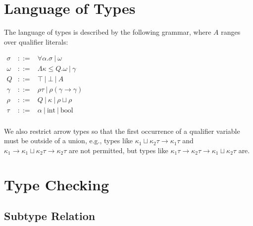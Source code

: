 \documentclass{article}
\begin{document}
\section{Language of Types}

The language of types is described by the following grammar, where $A$ ranges over qualifier literals:

\begin{math}
\begin{array}{rcl}
\sigma & ::= & \forall \alpha . \sigma\ |\ \omega \\

\omega & ::= & \Lambda \kappa \le Q . \omega\ |\ \gamma \\

Q & ::= & \top\ |\ \bot\ |\ A \\

\gamma & ::= & \rho \tau\ |\ \rho (\gamma \rightarrow \gamma) \\

\rho & ::= & Q\ |\ \kappa\ |\ \rho \sqcup \rho \\

\tau & ::= & \alpha\ |\ \textrm{int}\ |\ \textrm{bool} \\

\end{array}
\end{math}

We also restrict arrow types so that the first occurrence of a qualifier variable must be outside of a union, e.g., types like ${\kappa}_1 \sqcup {\kappa}_2 \tau \rightarrow {\kappa}_1 \tau$ and ${\kappa}_1 \rightarrow {\kappa}_1 \sqcup {\kappa}_2 \tau \rightarrow {\kappa}_2 \tau$ are not permitted, but types like ${\kappa}_1 \tau \rightarrow {\kappa}_2 \tau \rightarrow {\kappa}_1 \sqcup {\kappa}_2 \tau$ are.


\section{Type Checking}


\subsection{Subtype Relation}
\end{document}
